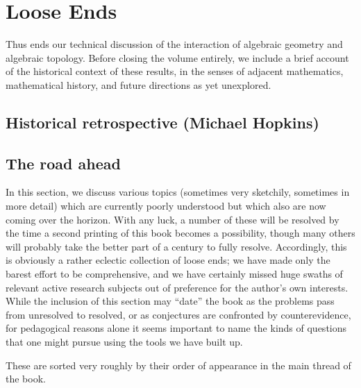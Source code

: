 
\chapter{Loose Ends}




Thus ends our technical discussion of the interaction of algebraic geometry and algebraic topology.  Before closing the volume entirely, we include a brief account of the historical context of these results, in the senses of adjacent mathematics, mathematical history, and future directions as yet unexplored.



\section{Historical retrospective (Michael Hopkins)}








\section{The road ahead}\label{OpenQuestionsSection}



In this section, we discuss various topics (sometimes very sketchily, sometimes in more detail) which are currently poorly understood but which also are now coming over the horizon.  With any luck, a number of these will be resolved by the time a second printing of this book becomes a possibility, though many others will probably take the better part of a century to fully resolve.  Accordingly, this is obviously a rather eclectic collection of loose ends; we have made only the barest effort to be comprehensive, and we have certainly missed huge swaths of relevant active research subjects out of preference for the author's own interests.  While the inclusion of this section may ``date'' the book as the problems pass from unresolved to resolved, or as conjectures are confronted by counterevidence, for pedagogical reasons alone it seems important to name the kinds of questions that one might pursue using the tools we have built up.

These are sorted very roughly by their order of appearance in the main thread of the book.








